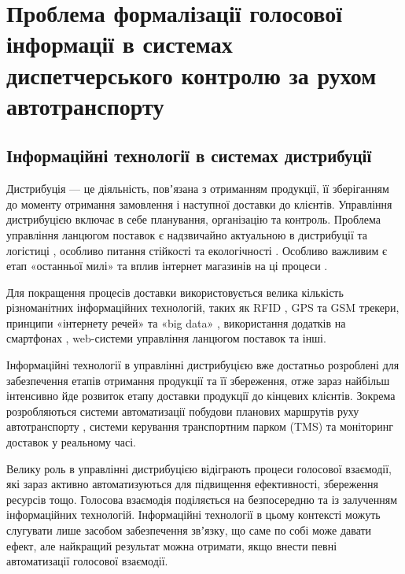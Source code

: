 \chapter{Проблема формалізації голосової інформації в системах диспетчерського контролю за рухом автотранспорту} \label{chapt1}

\section{Інформаційні технології в системах дистрибуції} \label{sect1_1}

Дистрибуція — це діяльність, повʼязана з отриманням продукції, її зберіганням до моменту отримання замовлення і наступної доставки до клієнтів. Управління дистрибуцією включає в себе планування, організацію та контроль. Проблема управління ланцюгом поставок є надзвичайно актуальною в дистрибуції та логістиці \cite{Speranza_2018}, особливо питання стійкості \cite{Koberg_2018,Jia_2018,Bastas_2019,Wen_2018,Sullet_2018} та екологічності \cite{Tseng_2019,Papetti_2019,Hoehne_2017}. Особливо важливим є етап «останньої милі» \cite{Baldi_2018,Gdowska_2018,Boysen_2018,Hoehne_2017,Pronello_2017,Cook_2017} та вплив інтернет магазинів на ці процеси \cite{Allen_2018,Cardenas_2017}.

Для покращення процесів доставки використовується велика кількість різноманітних інформаційних технологій, таких як RFID \cite{Prasanna_2012}, GPS \cite{Stopher_2018,Prasanna_2012} та GSM \cite{Prasanna_2012} трекери, принципи «інтернету речей» \cite{Liu_2018} та «big data» \cite{Govindan_2018}, використання додатків на смартфонах \cite{Stopher_2018}, web-системи управління ланцюгом поставок \cite{Papetti_2019} та інші.

Інформаційні технології в управлінні дистрибуцією вже достатньо розроблені для забезпечення етапів отримання продукції та її збереження, отже зараз найбільш інтенсивно йде розвиток етапу доставки продукції до кінцевих клієнтів. Зокрема розробляються системи автоматизації побудови планових маршрутів руху автотранспорту \cite{art1}, системи керування транспортним парком (TMS) та моніторинг доставок у реальному часі.

Велику роль в управлінні дистрибуцією відіграють процеси голосової взаємодії, які зараз активно автоматизуються для підвищення ефективності, збереження ресурсів тощо. Голосова взаємодія поділяється на безпосередню та із залученням інформаційних технологій. Інформаційні технології в цьому контексті можуть слугувати лише засобом забезпечення звʼязку, що саме по собі може давати ефект, але найкращий результат можна отримати, якщо внести певні автоматизації голосової взаємодії.


